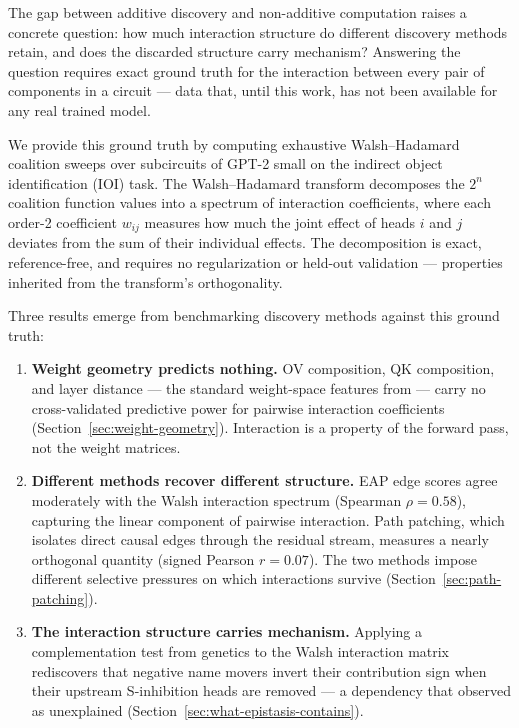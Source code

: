 \documentclass{article}
\begin{document}
The gap between additive discovery and non-additive computation raises a
concrete question: how much interaction structure do different discovery
methods retain, and does the discarded structure carry mechanism? Answering
the question requires exact ground truth for the interaction between every pair
of components in a circuit --- data that, until this work, has not been
available for any real trained model.

We provide this ground truth by computing exhaustive Walsh--Hadamard
coalition sweeps over subcircuits of GPT-2 small on the indirect object
identification (IOI) task. The Walsh--Hadamard transform decomposes the
$2^n$ coalition function values into a spectrum of interaction
coefficients, where each order-2 coefficient $w_{ij}$ measures how much
the joint effect of heads $i$ and $j$ deviates from the sum of their
individual effects. The decomposition is exact, reference-free, and
requires no regularization or held-out validation --- properties
inherited from the transform's orthogonality.

Three results emerge from benchmarking discovery methods against this
ground truth:

\begin{enumerate}
\item \textbf{Weight geometry predicts nothing.} OV composition, QK
  composition, and layer distance --- the standard weight-space features
  from \citet{elhage2021mathematical} --- carry no cross-validated
  predictive power for pairwise interaction coefficients
  (Section~\ref{sec:weight-geometry}). Interaction is a property of the
  forward pass, not the weight matrices.

\item \textbf{Different methods recover different structure.} EAP edge
  scores agree moderately with the Walsh interaction spectrum (Spearman
  $\rho = 0.58$), capturing the linear component of pairwise
  interaction. Path patching, which isolates direct causal edges through
  the residual stream, measures a nearly orthogonal quantity (signed
  Pearson $r = 0.07$). The two methods impose different selective
  pressures on which interactions survive
  (Section~\ref{sec:path-patching}).

\item \textbf{The interaction structure carries mechanism.} Applying a
  complementation test from genetics to the Walsh interaction matrix
  rediscovers that negative name movers invert their contribution sign
  when their upstream S-inhibition heads are removed --- a dependency
  that \citet{wang2022ioi} observed as unexplained
  (Section~\ref{sec:what-epistasis-contains}).
\end{enumerate}
\end{document}
